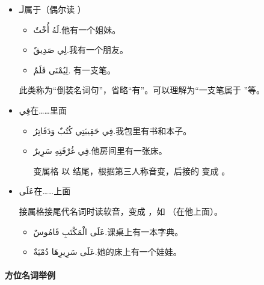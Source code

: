 \begin{itemize}
    \item \ac{لَـ}{属于（偶尔读  ）}
    \begin{itemize}
        \item \ac{لَهُ أُخْتٌ.}{他有一个姐妹。}
        \item \ac{لِي صَدِيقٌ.}{我有一个朋友。}
        \item \ac{لِيُمْنَى قَلَمٌ.}{  有一支笔。}
    \end{itemize}
    \begin{attention}
        此类称为``倒装名词句''，省略``有''。可以理解为``一支笔属于  ''等。
    \end{attention}

    \item \ac{فِي}{在……里面}
    \begin{itemize}
        \item \ac{فِي حَقِيبَتِي كُتُبٌ وَدَفَاتِرُ.}{我包里有书和本子。}
        \item \ac{فِي غُرْفَتِهِ سَرِيرٌ.}{他房间里有一张床。}
        \begin{attention}
             变属格  以  结尾，根据第三人称音变，后接的  变成 。
        \end{attention}
    \end{itemize}
    \item \ac{عَلَى}{在……上面}
    
    \begin{attention}
         接属格接尾代名词时读软音，变成  ，如  （在他上面）。
    \end{attention}

    \begin{itemize}
        \item \ac{عَلَى الْمَكْتَبِ قَامُوسٌ.}{课桌上有一本字典。}
        \item \ac{عَلَى سَرِيرِهَا دُمْيَةٌ.}{她的床上有一个娃娃。}
    \end{itemize}
\end{itemize}

\paragraph{方位名词举例}

